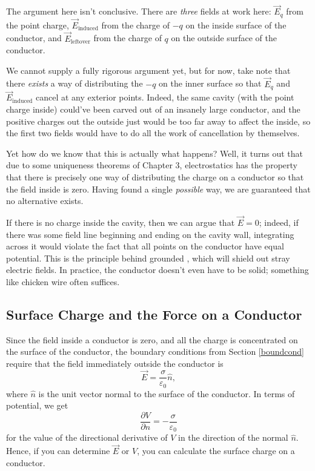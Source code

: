 \begin{remark}
The argument here isn't conclusive. There are \textit{three} fields at work here: $\vec{E}_q$ from the point charge, $\vec{E}_{\text{induced}}$ from the charge of $-q$ on the inside surface of the conductor, and $\vec{E}_{\text{leftover}}$ from the charge of $q$ on the outside surface of the conductor.

We cannot supply a fully rigorous argument yet, but for now, take note that there \textit{exists} a way of distributing the $-q$ on the inner surface so that $\vec{E}_q$ and $\vec{E}_{\text{induced}}$ cancel at any exterior points. Indeed, the same cavity (with the point charge inside) could've been carved out of an insanely large conductor, and the positive charges out the outside just would be too far away to affect the inside, so the first two fields would have to do all the work of cancellation by themselves.

Yet how do we know that this is actually what happens? Well, it turns out that due to some uniqueness theorems of Chapter 3, electrostatics has the property that there is precisely one way of distributing the charge on a conductor so that the field inside is zero. Having found a single \textit{possible} way, we are guaranteed that no alternative exists.
\end{remark}

If there is no charge inside the cavity, then we can argue that $\vec{E}=0$; indeed, if there was some field line beginning and ending on the cavity wall, integrating across it would violate the fact that all points on the conductor have equal potential. This is the principle behind grounded , which will shield out stray electric fields. In practice, the conductor doesn't even have to be solid; something like chicken wire often suffices.

\subsection{Surface Charge and the Force on a Conductor}\label{surfcharforcond}

Since the field inside a conductor is zero, and all the charge is concentrated on the surface of the conductor, the boundary conditions from Section \ref{boundcond} require that the field immediately outside the conductor is
\[\vec{E}=\frac{\sigma}{\varepsilon_0}\hat{n},\]
where $\hat{n}$ is the unit vector normal to the surface of the conductor. In terms of potential, we get
\[\frac{\partial V}{\partial n}=-\frac{\sigma}{\varepsilon_0}\]
for the value of the directional derivative of $V$ in the direction of the normal $\hat{n}$. Hence, if you can determine $\vec{E}$ or $V$, you can calculate the surface charge on a conductor.

